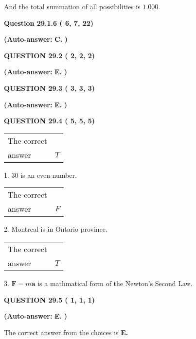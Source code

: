 \documentclass[12pt]{article}
\begin{document}
\noindent
 And the total summation of all possibilities is $  %
1.000 $.
 
  
  
{\textbf{\large{Question
29.1.6 
 (          6,          7,         22)
}}}
 
 
{\textbf{(Auto-answer:}}
{\textbf{\large{
C.}}}
{\textbf{)}}
 
 
  
  
{\textbf{\large{QUESTION
29.2 
 (          2,          2,          2)
}}}
 
 
{\textbf{(Auto-answer:}}
{\textbf{\large{
E.}}}
{\textbf{)}}
 
 
  
  
{\textbf{\large{QUESTION
29.3 
 (          3,          3,          3)
}}}
 
 
{\textbf{(Auto-answer:}}
{\textbf{\large{
E.}}}
{\textbf{)}}
 
 
  
  
{\textbf{\large{QUESTION
29.4 
 (          5,          5,          5)
}}}

 
\noindent\begin{tabular}{|l|l|}\hline The correct & \\
          answer &  %
$T$ \\ \hline \end{tabular}
1. $ %
30$ is an  %
even number.
 
\noindent\begin{tabular}{|l|l|}\hline The correct & \\
          answer &  %
$F$ \\ \hline \end{tabular}
2.  %
Montreal is in  %
Ontario province.
 
\noindent\begin{tabular}{|l|l|}\hline The correct & \\
          answer &  %
$T$ \\ \hline \end{tabular}
3.  %
$\mathbf{F}=m\mathbf{a}$ is a mathmatical form of  %
the Newton's Second Law.
 
  
  
{\textbf{\large{QUESTION
29.5 
 (          1,          1,          1)
}}}
 
 
{\textbf{(Auto-answer:}}
{\textbf{\large{
E.}}}
{\textbf{)}}
 
 

The correct answer from the choices is
{\textbf{\large{
E.}}}
 
  
  
\end{document}
